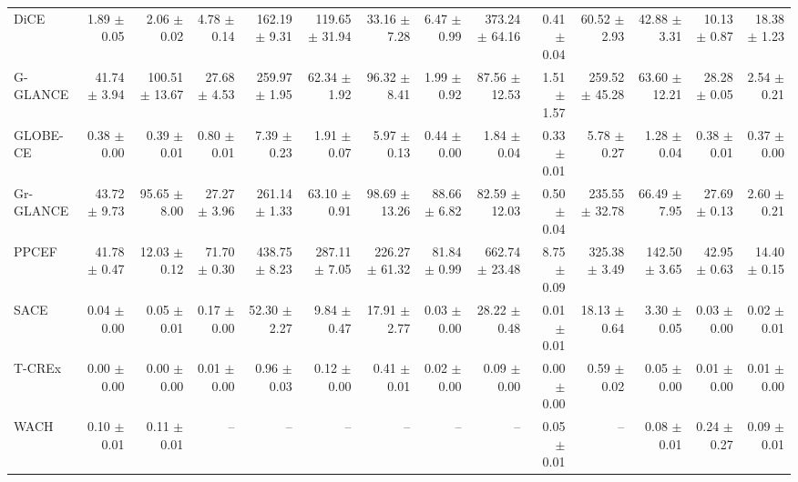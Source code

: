 \begin{table}[htbp]
{\begin{tabular}{lrrrrrrrrrrrrr}
DiCE & 1.89 $\pm$ 0.05 & 2.06 $\pm$ 0.02 & 4.78 $\pm$ 0.14 & 162.19 $\pm$ 9.31 & 119.65 $\pm$ 31.94 & 33.16 $\pm$ 7.28 & 6.47 $\pm$ 0.99 & 373.24 $\pm$ 64.16 & 0.41 $\pm$ 0.04 & 60.52 $\pm$ 2.93 & 42.88 $\pm$ 3.31 & 10.13 $\pm$ 0.87 & 18.38 $\pm$ 1.23 \\
G-GLANCE & 41.74 $\pm$ 3.94 & 100.51 $\pm$ 13.67 & 27.68 $\pm$ 4.53 & 259.97 $\pm$ 1.95 & 62.34 $\pm$ 1.92 & 96.32 $\pm$ 8.41 & 1.99 $\pm$ 0.92 & 87.56 $\pm$ 12.53 & 1.51 $\pm$ 1.57 & 259.52 $\pm$ 45.28 & 63.60 $\pm$ 12.21 & 28.28 $\pm$ 0.05 & 2.54 $\pm$ 0.21 \\
GLOBE-CE & 0.38 $\pm$ 0.00 & 0.39 $\pm$ 0.01 & 0.80 $\pm$ 0.01 & 7.39 $\pm$ 0.23 & 1.91 $\pm$ 0.07 & 5.97 $\pm$ 0.13 & 0.44 $\pm$ 0.00 & 1.84 $\pm$ 0.04 & 0.33 $\pm$ 0.01 & 5.78 $\pm$ 0.27 & 1.28 $\pm$ 0.04 & 0.38 $\pm$ 0.01 & 0.37 $\pm$ 0.00 \\
Gr-GLANCE & 43.72 $\pm$ 9.73 & 95.65 $\pm$ 8.00 & 27.27 $\pm$ 3.96 & 261.14 $\pm$ 1.33 & 63.10 $\pm$ 0.91 & 98.69 $\pm$ 13.26 & 88.66 $\pm$ 6.82 & 82.59 $\pm$ 12.03 & 0.50 $\pm$ 0.04 & 235.55 $\pm$ 32.78 & 66.49 $\pm$ 7.95 & 27.69 $\pm$ 0.13 & 2.60 $\pm$ 0.21 \\
PPCEF & 41.78 $\pm$ 0.47 & 12.03 $\pm$ 0.12 & 71.70 $\pm$ 0.30 & 438.75 $\pm$ 8.23 & 287.11 $\pm$ 7.05 & 226.27 $\pm$ 61.32 & 81.84 $\pm$ 0.99 & 662.74 $\pm$ 23.48 & 8.75 $\pm$ 0.09 & 325.38 $\pm$ 3.49 & 142.50 $\pm$ 3.65 & 42.95 $\pm$ 0.63 & 14.40 $\pm$ 0.15 \\
SACE & 0.04 $\pm$ 0.00 & 0.05 $\pm$ 0.01 & 0.17 $\pm$ 0.00 & 52.30 $\pm$ 2.27 & 9.84 $\pm$ 0.47 & 17.91 $\pm$ 2.77 & 0.03 $\pm$ 0.00 & 28.22 $\pm$ 0.48 & 0.01 $\pm$ 0.01 & 18.13 $\pm$ 0.64 & 3.30 $\pm$ 0.05 & 0.03 $\pm$ 0.00 & 0.02 $\pm$ 0.01 \\
T-CREx & 0.00 $\pm$ 0.00 & 0.00 $\pm$ 0.00 & 0.01 $\pm$ 0.00 & 0.96 $\pm$ 0.03 & 0.12 $\pm$ 0.00 & 0.41 $\pm$ 0.01 & 0.02 $\pm$ 0.00 & 0.09 $\pm$ 0.00 & 0.00 $\pm$ 0.00 & 0.59 $\pm$ 0.02 & 0.05 $\pm$ 0.00 & 0.01 $\pm$ 0.00 & 0.01 $\pm$ 0.00 \\
WACH & 0.10 $\pm$ 0.01 & 0.11 $\pm$ 0.01 & -- & -- & -- & -- & -- & -- & 0.05 $\pm$ 0.01 & -- & 0.08 $\pm$ 0.01 & 0.24 $\pm$ 0.27 & 0.09 $\pm$ 0.01 \\
\bottomrule
\end{tabular}}
\end{table}